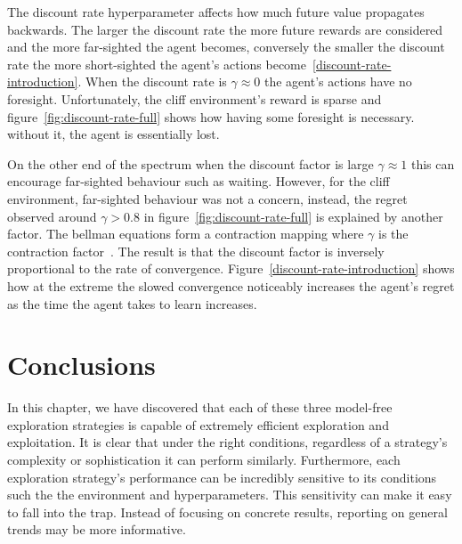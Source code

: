 \documentclass[]{final_report}
\begin{document}
  
  

The discount rate hyperparameter affects how much future value propagates backwards. The larger the discount rate the more future rewards are considered and the more far-sighted the agent becomes, conversely the smaller the discount rate the more short-sighted the agent's actions become~\ref{discount-rate-introduction}. When the discount rate is $\gamma \approx 0$ the agent's actions have no foresight. Unfortunately, the cliff environment's reward is sparse and figure~\ref{fig:discount-rate-full} shows how having some foresight is necessary. without it, the agent is essentially lost. 

On the other end of the spectrum when the discount factor is large $\gamma \approx 1$ this can encourage far-sighted behaviour such as waiting. However, for the cliff environment, far-sighted behaviour was not a concern, instead, the regret observed around $\gamma > 0.8$ in figure~\ref{fig:discount-rate-full} is explained by another factor. The bellman equations form a contraction mapping where $\gamma$ is the contraction factor~\cite{QlearningConvergance}. The result is that the discount factor is inversely proportional to the rate of convergence. Figure~\ref{discount-rate-introduction} shows how at the extreme the slowed convergence noticeably increases the agent's regret as the time the agent takes to learn increases.
\newpage
\section{Conclusions}

In this chapter, we have discovered that each of these three model-free exploration strategies is capable of extremely efficient exploration and exploitation. It is clear that under the right conditions, regardless of a strategy's complexity or sophistication it can perform similarly. Furthermore, each exploration strategy's performance can be incredibly sensitive to its conditions such the the environment and hyperparameters. This sensitivity can make it easy to fall into the  trap. Instead of focusing on concrete results, reporting on general trends may be more informative. 
\end{document}
